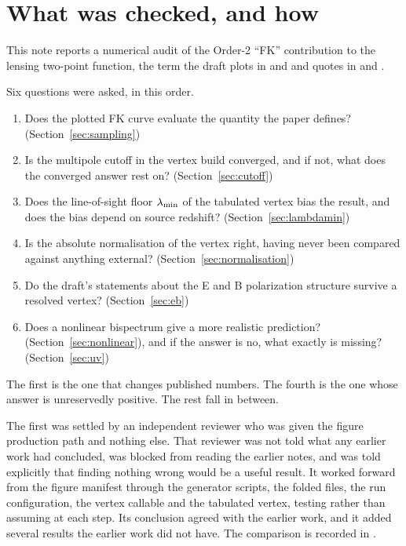 \section{What was checked, and how}
\label{sec:scope}

This note reports a numerical audit of the Order-2 ``FK'' contribution to
the lensing two-point function, the term the draft plots in
 and
 and quotes in
 and .

Six questions were asked, in this order.

\begin{enumerate}
\item Does the plotted FK curve evaluate the quantity the paper defines?
      (Section~\ref{sec:sampling})
\item Is the multipole cutoff in the vertex build converged, and if not,
      what does the converged answer rest on? (Section~\ref{sec:cutoff})
\item Does the line-of-sight floor $\lambda_{\min}$ of the tabulated vertex bias
      the result, and does the bias depend on source redshift?
      (Section~\ref{sec:lambdamin})
\item Is the absolute normalisation of the vertex right, having never been
      compared against anything external? (Section~\ref{sec:normalisation})
\item Do the draft's statements about the E and B polarization structure
      survive a resolved vertex? (Section~\ref{sec:eb})
\item Does a nonlinear bispectrum give a more realistic prediction?
      (Section~\ref{sec:nonlinear}), and if the answer is no, what exactly
      is missing? (Section~\ref{sec:uv})
\end{enumerate}

The first is the one that changes published numbers. The fourth is the one
whose answer is unreservedly positive. The rest fall in between.

The first was settled by an independent reviewer who was given the figure
production path and nothing else. That reviewer was not told what any
earlier work had concluded, was blocked from reading the earlier notes, and
was told explicitly that finding nothing wrong would be a useful result. It
worked forward from the figure manifest through the generator scripts, the
folded  files, the run configuration, the vertex callable
and the tabulated vertex, testing rather than assuming at each step. Its
conclusion agreed with the earlier work, and it added several results the
earlier work did not have. The comparison is recorded in
.

